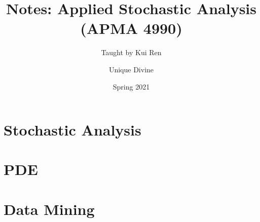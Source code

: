 \documentclass[11pt, fancy, cite=numbers]{elegantbook}
\title{Notes: Applied Stochastic Analysis (APMA 4990)}
\subtitle{Taught by Kui Ren}
\author{Unique Divine}
\institute{Columbia University}
\date{Spring 2021}
\begin{document}
\maketitle

\frontmatter

\tableofcontents

\mainmatter


\part{Stochastic Analysis}


\part{PDE}


\part{Data Mining}





\end{document}
